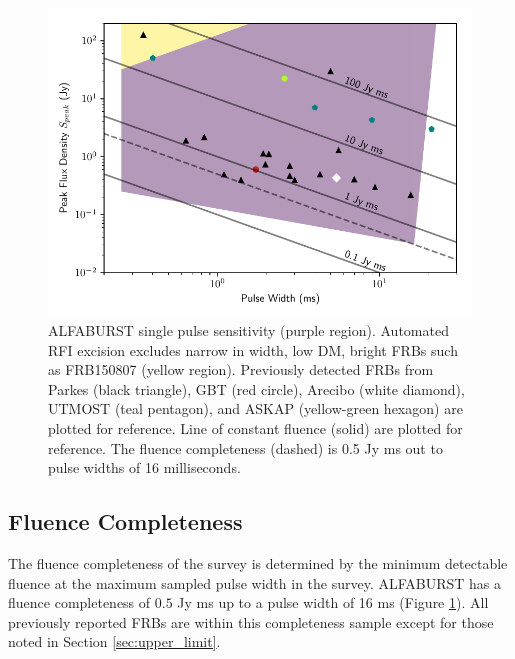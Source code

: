 \documentclass[a4paper,fleqn,usenatbib]{mnras}
\begin{document}
\begin{figure}
    \includegraphics[width=1.0\linewidth]{figures/sensitivity_range.pdf}
    \caption{ALFABURST single pulse sensitivity (purple region). Automated RFI
    excision excludes narrow in width, low DM, bright FRBs such as FRB150807
    (yellow region).  Previously detected FRBs from Parkes (black triangle), GBT
    (red circle), Arecibo (white diamond), UTMOST (teal pentagon), and ASKAP
    (yellow-green hexagon) are plotted for reference. Line of constant fluence
    (solid) are plotted for reference. The fluence completeness (dashed) is 0.5
    Jy ms out to pulse widths of 16 milliseconds.
    }
    \label{fig:sensitivity_range}
\end{figure}



\subsection{Fluence Completeness}
\label{sec:fluence}

The fluence completeness of the survey \citep{2015MNRAS.447.2852K} is determined
by the minimum detectable fluence at the maximum sampled pulse width in the
survey. ALFABURST has a fluence completeness of $0.5$ Jy ms up to a pulse width
of 16 ms (Figure \ref{fig:sensitivity_range}). All previously reported FRBs are
within this completeness sample except for those noted in Section
\ref{sec:upper_limit}.

\end{document}
